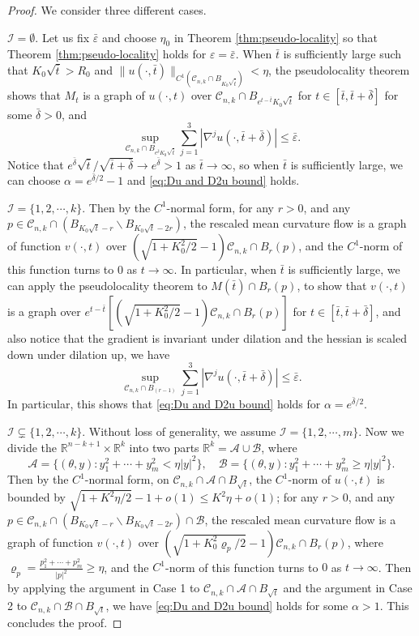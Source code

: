 \documentclass[11pt]{amsart}
\numberwithin{equation}{section}
\numberwithin{equation}{section}
\newcommand{\eps}{\varepsilon}
\newcommand{\cA}{\mathcal{A}}
\newcommand{\cB}{\mathcal{B}}
\newcommand{\cC}{\mathcal{C}}
\newcommand{\cI}{\mathcal{I}}
\newcommand{\R}{\mathbb{R}}
\begin{document}
	\begin{proof}
		We consider three different cases.
		
		 $\cI=\emptyset$. Let us fix $\bar\eps$ and choose $\eta_0$ in Theorem \ref{thm:pseudo-locality} so that Theorem \ref{thm:pseudo-locality} holds for $\eps=\bar\eps$. When $\bar t$ is sufficiently large such that $K_0\sqrt{\bar t}>R_0$ and $\|u(\cdot,\bar t)\|_{C^1(\cC_{n,k}\cap B_{K_0\sqrt{\bar t}})}<\eta$, the pseudolocality theorem shows that $M_t$ is a graph of $u(\cdot,t)$ over $\cC_{n,k}\cap B_{e^{t-\bar t}K_0\sqrt{\bar t}}$ for $t\in[\bar t,\bar t+\bar\delta]$ for some $\bar\delta>0$, and
		\[
		\sup_{\cC_{n,k}\cap B_{e^{\bar \delta}K_0\sqrt{\bar t}}}
		\sum_{j=1}^3|\nabla^j u(\cdot,\bar t+\bar\delta)|
		\leq \bar\eps.
		\]
		Notice that $e^{\bar\delta}\sqrt{\bar t}/\sqrt{\bar t+\bar \delta}\to e^{\bar \delta}>1$ as $\bar t\to\infty$, so when $\bar t$ is sufficiently large, we can choose $\alpha=e^{\bar \delta/2}-1$ and \eqref{eq:Du and D2u bound} holds.
		
		 $\cI=\{1,2,\cdots,k\}$. Then by the $C^1$-normal form, for any $r>0$, and any $p\in\cC_{n,k}\cap (B_{K_0\sqrt{t}-r}\backslash B_{K_0\sqrt{t}-2r})$, the rescaled mean curvature flow is a graph of function $v(\cdot,t)$ over $(\sqrt{1+K_0^2/2}-1)\cC_{n,k}\cap B_r(p)$, and the $C^1$-norm of this function turns to $0$ as $t\to\infty$. In particular, when $\bar t$ is sufficiently large, we can apply the pseudolocality theorem to $M(\bar t)\cap B_r(p)$, to show that $v(\cdot,t)$ is a graph over $e^{t-\bar t}[(\sqrt{1+K_0^2/2}-1)\cC_{n,k}\cap B_r(p)]$ for $t\in[\bar t,\bar t+\bar \delta]$, and also notice that the gradient is invariant under dilation and the hessian is scaled down under dilation up, we have 
		\[
		\sup_{\cC_{n,k}\cap B_{(r-1)}}
		\sum_{j=1}^3|\nabla^j u(\cdot,\bar t+\bar \delta)|
		\leq \bar\eps.
		\]
		In particular, this shows that \eqref{eq:Du and D2u bound} holds for $\alpha=e^{\bar \delta/2}$.
		
		 $\cI\subsetneq \{1,2,\cdots,k\}$. Without loss of generality, we assume $\cI=\{1,2,\cdots,m\}$. Now we divide the $\R^{n-k+1}\times\R^k$ into two parts $\R^k=\cA\cup\cB$, where
		\[
		\cA=\{(\theta,y):y_1^2+\cdots+y_m^2<\eta|y|^2\},
		\quad 
		\cB=\{(\theta,y):y_1^2+\cdots+y_m^2\geq \eta|y|^2\}.
		\]
		Then by the $C^1$-normal form, on $\cC_{n,k}\cap \cA\cap B_{\sqrt{t}}$, the $C^1$-norm of $u(\cdot,t)$ is bounded by $\sqrt{1+K^2\eta/2}-1+o(1)\leq K^2\eta+o(1)$; for any $r>0$, and any $p\in\cC_{n,k}\cap (B_{K_0\sqrt{t}-r}\backslash B_{K_0\sqrt{t}-2r})\cap \cB$, the rescaled mean curvature flow is a graph of function $v(\cdot,t)$ over $(\sqrt{1+K_0^2\varrho_p/2}-1)\cC_{n,k}\cap B_r(p)$, where $\varrho_p=\frac{p_1^2+\cdots+p_m^2}{|p|^2}\geq \eta$, and the $C^1$-norm of this function turns to $0$ as $t\to\infty$. Then by applying the argument in Case 1 to $\cC_{n,k}\cap \cA\cap B_{\sqrt{t}}$ and the argument in Case 2 to $\cC_{n,k}\cap \cB\cap B_{\sqrt{t}}$, we have \eqref{eq:Du and D2u bound} holds for some $\alpha>1$. This concludes the proof.
	\end{proof}
	
\end{document}
